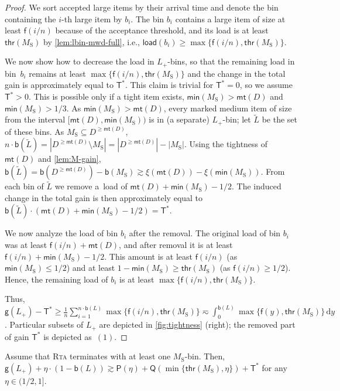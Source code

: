 \documentclass[a4paper,USenglish,cleveref]{lipics-v2019}
\newcommand{\LG}{\ensuremath{L}\xspace}
\newcommand{\M}{\ensuremath{M_\mathrm{S}}\xspace}
\newcommand{\LT}{\ensuremath{L_+}\xspace}
\newcommand{\D}{\ensuremath{D}\xspace}
\newcommand{\f}{\textsf{f}}
\newcommand{\g}{\ensuremath{\xi}}
\newcommand{\water}{\textsf{Q}}
\newcommand{\cutintegral}{\textsf{P}}
\newcommand{\B}{\textsf{b}}
\newcommand{\gain}{\textsf{g}}
\newcommand{\load}{\textsf{load}}
\newcommand{\thresh}{\textsf{thr}(\M)}
\newcommand{\mn}{\textsf{min}}
\newcommand{\mt}{\textsf{mt}(\D)}
\newcommand{\T}{\textsf{T}}
\newcommand{\Tmax}{\T^*}
\newcommand{\dd}{\mathrm{d}}
\newcommand{\ALG}{\textsc{Rta}\xspace}
\begin{document}
\begin{proof}
We sort accepted large items by their arrival time and denote the bin containing
the $i$-th large item by $b_i$. The bin $b_i$ contains a large item of size at
least $\f(i/n)$ because of the acceptance threshold, and its load is at least
$\thresh$ by \cref{lem:lbin-mwd-full}, i.e., $\load(b_i) \geq \max \{ \f(i/n),
\thresh \}$.

We now show how to decrease the load in $\LT$-bins, so that the
remaining load in bin~$b_i$ remains at least $\max \{ \f(i/n), \thresh \}$ 
and the change in the total gain is approximately equal to $\Tmax$. 
This claim
is trivial for $\Tmax = 0$, so we assume $\Tmax > 0$. This
is possible only if a tight item exists, $\mn(\M) > \mt$ and $\mn(\M) > 1/3$. As
$\mn(\M) > \mt$, every marked medium item of size from the interval $[\mt, \mn(\M))$ is in (a
separate) \LT-bin; let $\tilde{L}$ be the set of these bins. As $\M \subseteq
\D^{\geq \mt}$, $n \cdot \B(\tilde{L}) = |\D^{\geq \mt} \setminus \M| =
|\D^{\geq \mt}| - |\M|$. Using the tightness of $\mt$ and \cref{lem:M-gain},
$\B(\tilde{L}) = \B(\D^{\geq \mt}) - \B(\M) \gtrsim \g(\mt) - \g(\mn(\M))$. From
each bin of $\tilde{L}$ we remove a~load of $\mt + \mn(\M) - 1/2$.
The induced change in the total gain is then approximately equal to $\B(\tilde{L}) \cdot (\mt + \mn(\M) - 1/2) =
\Tmax$.

We now analyze the load of bin $b_i$ after the removal. 
The original load of bin $b_i$ was at least $\f(i/n) + \mt$, and 
after removal it is at least 
$\f(i/n) + \mn(\M) - 1/2$. This amount is at least $\f(i/n)$ (as $\mn(\M) \leq 1/2$)
and at least $1-\mn(\M) \geq \thresh$ (as $\f(i/n) \geq 1/2$).
Hence, the remaining load of $b_i$ is at least $\max \{ \f(i/n), \thresh \}$. 

Thus,
$\gain(\LT) - \Tmax 
  \geq \frac{1}{n} \sum_{i=1}^{n \cdot \B(\LG)} \max\{ \f(i/n), \thresh \}
  \eqsim \int_0^{\B(\LG)} \max\{ \f(y), \thresh \} \, \dd y$. 
Particular subsets of $\LT$ are depicted in \cref{fig:tightness} (right);
the removed part of gain $\Tmax$ is depicted as~$(1)$.
\end{proof}



\begin{lemma}
\label{lem:gain-L-improved}
Assume that \ALG terminates with at least one $\M$-bin.
Then, $\gain(\LT) + \eta \cdot (1-\B(\LG)) \gtrsim \cutintegral(\eta) +
\water(\min\{\thresh, \eta\}) + \Tmax$ for any $\eta \in (1/2, 1]$.
\end{lemma}
\end{document}
